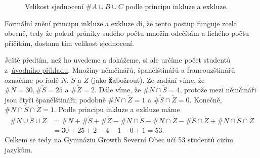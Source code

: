 \begin{figure}[h]
 \centering
 \caption{Velikost sjednocení $\# A \cup B \cup C$ podle principu inkluze a
 exkluze.}
 \label{fig:inkluze-exkluze-4}
\end{figure}

Formální znění principu inkluze a exkluze dí, že tento postup funguje zcela
obecně, tedy že pokud průniky sudého počtu množin odečítám a lichého počtu
přičítám, dostanu tím velikost sjednocení.

Ještě předtím, než ho uvedeme a dokážeme, si ale určíme počet studentů
z~\hyperref[exam:inkluze-exkluze]{úvodního příkladu}. Množiny němčinářů,
španělštinářů a francouzštinářů označíme po řadě $N$, $\check{S}$ a $\check{Z}$
(jako \textbf{ž}abožrout). Ze zadání víme, že $\# N = 30, \# \check{S} = 25$ a
$\# \check{Z} = 2$. Dále víme, že $\# N \cap \check{S} = 4$, protože mezi
němčináři jsou čtyři španělštináři; podobně $\# N \cap \check{Z} = 1$ a $\#
\check{S} \cap \check{Z} = 0$. Konečně, $\# N  \cap \check{S} \cap \check{Z} =
1$. Podle principu inkluze a exkluze máme
\begin{align*}
 \# N \cup \check{S} \cup \check{Z} &= \# N + \# \check{S} + \# \check{Z} - \# N
  \cap \check{S} - \# N  \cap \check{Z} - \# \check{S} \cap \check{Z} + \# N
  \cap \check{S}  \cap \check{Z}\\
 &= 30 + 25 + 2 - 4 - 1 - 0 + 1 = 53.
\end{align*}
Celkem se tedy na Gymnáziu Growth Severní Obec učí 53 studentů cizím jazykům.

